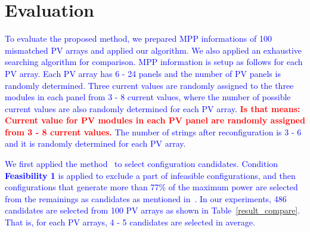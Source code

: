 \documentclass[conference]{pvsctran}
\newcommand{\michiko}{\textcolor{blue}}
\newcommand{\zhao}{\textcolor{red}}
\begin{document}
\section{Evaluation}\label{Sec6}

\michiko{To evaluate the proposed method, we prepared MPP informations of 100 mismatched PV arrays and applied our algorithm. We also applied an exhaustive searching algorithm for comparison.
MPP information is setup as follows for each PV array. 
Each PV array has 6 - 24  panels and the number of PV panels is randomly determined. 
Three current values are randomly assigned to the three modules in each panel from 3 - 8 current values, where the number of possible current values are also randomly determined for each PV array.
\zhao{\large \textbf{Is that means: Current value for PV modules in each PV panel are randomly assigned from 3 - 8 current values.}}
The number of strings after reconfiguration is 3 - 6 and it is randomly determined for each PV array.}

\michiko{We first applied the method~\cite{orozco2016optimized} to select configuration candidates. Condition \textbf{Feasibility 1} is applied to exclude a part of infeasible configurations, and then configurations that generate more than 77\% of the maximum power are selected from the remainings as candidates as mentioned in~\cite{orozco2016optimized}.  In our experiments, 486 candidates are selected from 100 PV arrays as shown in Table~\ref{result_compare}. That is, for each PV arrays, 4 - 5 candidates are selected in average.}
\end{document}
